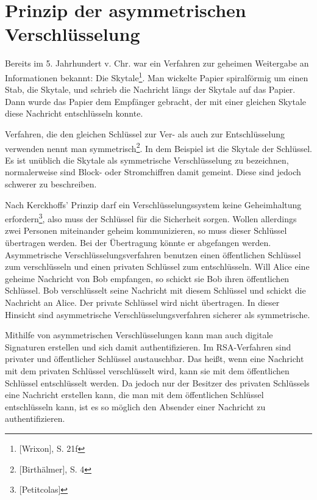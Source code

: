 \section{Prinzip der asymmetrischen Verschlüsselung}
Bereits im 5. Jahrhundert v. Chr. war ein Verfahren zur geheimen Weitergabe an Informationen bekannt: Die Skytale\footnote{[Wrixon], S. 21f}. Man wickelte Papier spiralförmig um einen Stab, die Skytale,  und schrieb die Nachricht längs der Skytale auf das Papier. Dann wurde das Papier dem Empfänger gebracht, der mit einer gleichen Skytale diese Nachricht entschlüsseln konnte.

Verfahren, die den gleichen Schlüssel zur Ver- als auch zur Entschlüsselung verwenden nennt man symmetrisch\footnote{[Birthälmer], S. 4}. In dem Beispiel ist die Skytale der Schlüssel. Es ist unüblich die Skytale als symmetrische Verschlüsselung zu bezeichnen, normalerweise sind Block- oder Stromchiffren damit gemeint. Diese sind jedoch schwerer zu beschreiben.

Nach Kerckhoffs' Prinzip darf ein Verschlüsselungssystem keine Geheimhaltung erfordern\footnote{[Petitcolas]}, also muss der Schlüssel für die Sicherheit sorgen. Wollen allerdings zwei Personen miteinander geheim kommunizieren, so muss dieser Schlüssel übertragen werden. Bei der Übertragung könnte er abgefangen werden.
Asymmetrische Verschlüsselungsverfahren benutzen einen öffentlichen Schlüssel zum verschlüsseln und einen privaten Schlüssel zum entschlüsseln. Will Alice eine geheime Nachricht von Bob empfangen, so schickt sie Bob ihren öffentlichen Schlüssel. Bob verschlüsselt seine Nachricht mit diesem Schlüssel und schickt die Nachricht an Alice. Der private Schlüssel wird nicht übertragen. In dieser Hinsicht sind asymmetrische Verschlüsselungsverfahren sicherer als symmetrische.

Mithilfe von asymmetrischen Verschlüsselungen kann man auch digitale Signaturen erstellen und sich damit authentifizieren. Im RSA-Verfahren sind privater und öffentlicher Schlüssel austauschbar. Das heißt, wenn eine Nachricht mit dem privaten Schlüssel verschlüsselt wird, kann sie mit dem öffentlichen Schlüssel entschlüsselt werden. Da jedoch nur der Besitzer des privaten Schlüssels eine Nachricht erstellen kann, die man mit dem öffentlichen Schlüssel entschlüsseln kann, ist es so möglich den Absender einer Nachricht zu authentifizieren.
